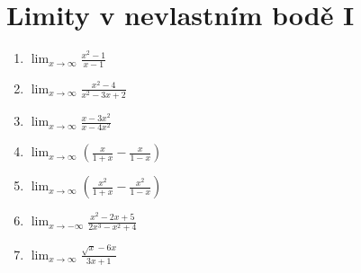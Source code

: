 \documentclass[10pt,a4paper]{article}
\begin{document}
\section*{Limity v nevlastním bodě I}


\begin{enumerate}
	\everymath{\displaystyle}
	\parskip\bigskipamount
	\item $\lim_{x\to\infty} \frac{x^2-1}{x-1}$
	\item $\lim_{x\to\infty} \frac{x^2-4}{x^2 - 3x + 2}$
	\item $\lim_{x\to\infty} \frac{x - 3x^2}{x - 4x^2}$
	\item $\lim_{x\to\infty} \left( \frac{x}{1+x} - \frac{x}{1-x} \right)$
	\item $\lim_{x\to\infty} \left( \frac{x^2}{1+x} - \frac{x^2}{1-x} \right)$
	\item $\lim_{x \to -\infty} \frac{x^2 - 2x + 5}{2x^3 - x^2 + 4}$
	\item $\lim_{x \to \infty} \frac{\sqrt x - 6x}{3x+1}$
	
	
\end{enumerate}

\newpage
\end{document}
